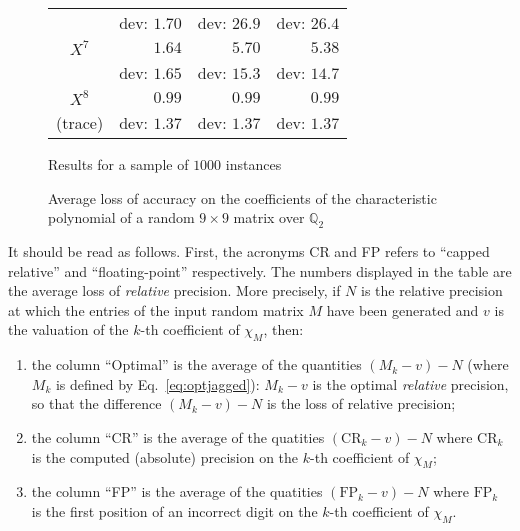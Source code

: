 \documentclass{sig-alternate-05-2015}
\newcommand{\Q}{\mathbb Q}
\begin{document}
\begin{figure}
{\begin{tabular}{|c|r|r|r|}
& {\scriptsize dev: $1.70$} & {\scriptsize dev: $26.9$} & {\scriptsize dev: $26.4$} \\
\rule{0pt}{2.7ex}%
$X^7$ & $1.64$ &   $5.70$           &   $5.38$ \vspace{-1.5ex} \\
& {\scriptsize dev: $1.65$} & {\scriptsize dev: $15.3$} & {\scriptsize dev: $14.7$} \\
\rule{0pt}{2.7ex}%
$X^8$ & $0.99$ &   $0.99$           &   $0.99$ \vspace{-1.5ex} \\
{\scriptsize (trace)} 
& {\scriptsize dev: $1.37$} & {\scriptsize dev: $1.37$} & {\scriptsize dev: $1.37$} \\
\hline
\end{tabular}}
\hfill\null

\medskip

\hfill
{\footnotesize Results for a sample of $1000$ instances}
\hfill\null

\caption{Average loss of accuracy on the coefficients
of the characteristic polynomial of a random $9 \times 9$
matrix over $\Q_2$}
\label{fig:exp}

\end{figure}
%
It should be read as follows. First, the acronyms CR and FP 
refers to ``capped relative'' and ``floating-point'' respectively.
The numbers displayed in the table are the average loss of
\emph{relative} precision. 
More precisely, if $N$ is the relative precision at
which the entries of the input random matrix $M$ have been generated
and $v$ is the valuation of the $k$-th coefficient of $\chi_M$, then:

\vspace{-2mm}

\begin{enumerate}[$\bullet$]
\renewcommand{\itemsep}{0pt}
\item the column ``Optimal'' is the average of the quantities 
$(M_k{-}v) - N$ (where $M_k$ is defined by Eq.~\eqref{eq:optjagged}): 
$M_k{-}v$ is the optimal \emph{relative} precision, so that the
difference $(M_k{-}v) - N$ is the loss of relative precision;
\item the column ``CR'' is the average of the quatities 
$(\text{CR}_k{-}v) - N$ where $\text{CR}_k$ is the computed (absolute) 
precision on the $k$-th coefficient of $\chi_M$;
\item the column ``FP'' is the average of the quatities 
$(\text{FP}_k{-}v) - N$ where $\text{FP}_k$ is the first position of
an incorrect digit on the $k$-th coefficient of $\chi_M$.
\end{enumerate}
\end{document}
